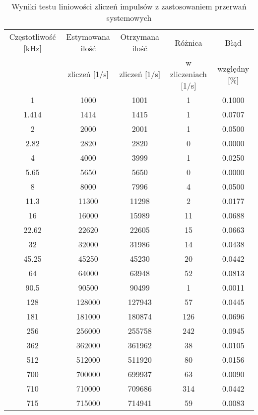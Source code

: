 \begin{table}
        \centering
        \caption{Wyniki testu liniowości zliczeń impulsów  z zastosowaniem przerwań systemowych}
        \label{rts table}
        \begin{tabular}{|c|c|c|c|c|}  
                \hline 
                Częstotliwość [kHz] & Estymowana ilość   & Otrzymana ilość & Różnica& Błąd \\ 
                &  zliczeń [1/s] &  zliczeń  [1/s]& w zliczeniach [1/s] & względny [\%]\\ \hline
                1 & 1000 & 1001 & 1 & 0.1000\\ \hline 
                1.414 & 1414 & 1415 & 1 & 0.0707\\ \hline 
                2 & 2000 & 2001 & 1 & 0.0500\\ \hline 
                2.82 & 2820 & 2820 & 0 & 0.0000\\ \hline 
                4 & 4000 & 3999 & 1 & 0.0250\\ \hline 
                5.65 & 5650 & 5650 & 0 & 0.0000\\ \hline 
                8 & 8000 & 7996 & 4 & 0.0500\\ \hline 
                11.3 & 11300 & 11298 & 2 & 0.0177\\ \hline 
                16 & 16000 & 15989 & 11 & 0.0688\\ \hline 
                22.62 & 22620 & 22605 & 15 & 0.0663\\ \hline 
                32 & 32000 & 31986 & 14 & 0.0438\\ \hline 
                45.25 & 45250 & 45230 & 20 & 0.0442\\ \hline 
                64 & 64000 & 63948 & 52 & 0.0813\\ \hline 
                90.5 & 90500 & 90499 & 1 & 0.0011\\ \hline 
                128 & 128000 & 127943 & 57 & 0.0445\\ \hline 
                181 & 181000 & 180874 & 126 & 0.0696\\ \hline 
                256 & 256000 & 255758 & 242 & 0.0945\\ \hline 
                362 & 362000 & 361962 & 38 & 0.0105\\ \hline 
                512 & 512000 & 511920 & 80 & 0.0156\\ \hline 
                700 & 700000 & 699937 & 63 & 0.0090\\ \hline 
                710 & 710000 & 709686 & 314 & 0.0442\\ \hline 
                715 & 715000 & 714941 & 59 & 0.0083\\ \hline
        \end{tabular}
\end{table}


